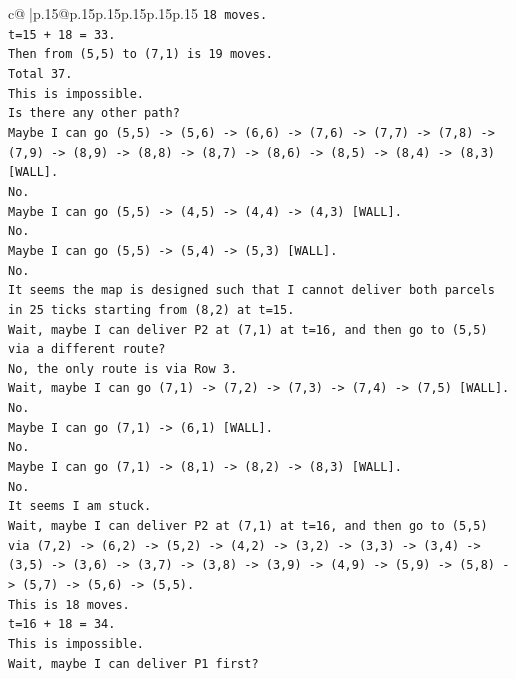 \documentclass{article}
\begin{document}
{\begin{supertabular}{c@{$\;$}|p{.15\linewidth}@{}p{.15\linewidth}p{.15\linewidth}p{.15\linewidth}p{.15\linewidth}p{.15\linewidth}}
{{{\texttt{18 moves.} \\
\texttt{t=15 + 18 = 33.} \\
\texttt{Then from (5,5) to (7,1) is 19 moves.} \\
\texttt{Total 37.} \\
\texttt{This is impossible.} \\
\texttt{Is there any other path?} \\
\texttt{Maybe I can go (5,5) {-}> (5,6) {-}> (6,6) {-}> (7,6) {-}> (7,7) {-}> (7,8) {-}> (7,9) {-}> (8,9) {-}> (8,8) {-}> (8,7) {-}> (8,6) {-}> (8,5) {-}> (8,4) {-}> (8,3) {[}WALL{]}.} \\
\texttt{No.} \\
\texttt{Maybe I can go (5,5) {-}> (4,5) {-}> (4,4) {-}> (4,3) {[}WALL{]}.} \\
\texttt{No.} \\
\texttt{Maybe I can go (5,5) {-}> (5,4) {-}> (5,3) {[}WALL{]}.} \\
\texttt{No.} \\
\texttt{It seems the map is designed such that I cannot deliver both parcels in 25 ticks starting from (8,2) at t=15.} \\
\texttt{Wait, maybe I can deliver P2 at (7,1) at t=16, and then go to (5,5) via a different route?} \\
\texttt{No, the only route is via Row 3.} \\
\texttt{Wait, maybe I can go (7,1) {-}> (7,2) {-}> (7,3) {-}> (7,4) {-}> (7,5) {[}WALL{]}.} \\
\texttt{No.} \\
\texttt{Maybe I can go (7,1) {-}> (6,1) {[}WALL{]}.} \\
\texttt{No.} \\
\texttt{Maybe I can go (7,1) {-}> (8,1) {-}> (8,2) {-}> (8,3) {[}WALL{]}.} \\
\texttt{No.} \\
\texttt{It seems I am stuck.} \\
\texttt{Wait, maybe I can deliver P2 at (7,1) at t=16, and then go to (5,5) via (7,2) {-}> (6,2) {-}> (5,2) {-}> (4,2) {-}> (3,2) {-}> (3,3) {-}> (3,4) {-}> (3,5) {-}> (3,6) {-}> (3,7) {-}> (3,8) {-}> (3,9) {-}> (4,9) {-}> (5,9) {-}> (5,8) {-}> (5,7) {-}> (5,6) {-}> (5,5).} \\
\texttt{This is 18 moves.} \\
\texttt{t=16 + 18 = 34.} \\
\texttt{This is impossible.} \\
\texttt{Wait, maybe I can deliver P1 first?} \\
}}}
\end{supertabular}}
\end{document}
